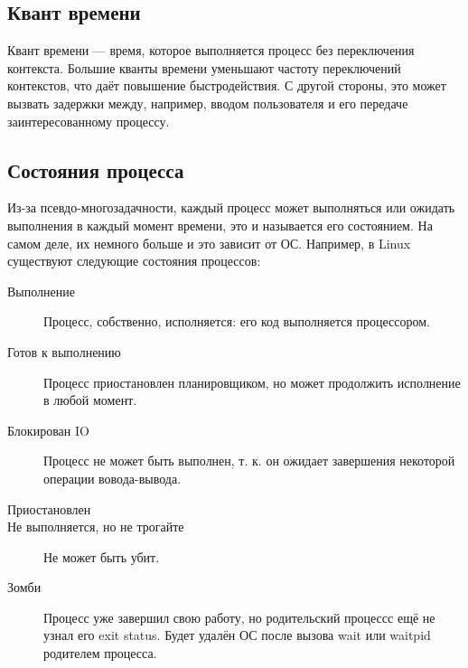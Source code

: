 \documentclass[main]{subfiles}
\begin{document}
\subsection{Квант времени}
Квант времени --- время, которое выполняется процесс без переключения контекста.
Большие кванты времени уменьшают частоту переключений контекстов, что даёт
повышение быстродействия. С другой стороны, это может вызвать задержки между,
например, вводом пользователя и его передаче заинтересованному процессу.

\subsection{Состояния процесса}
Из-за псевдо-многозадачности, каждый процесс может выполняться или ожидать
выполнения в каждый момент времени, это и называется его состоянием.
На самом деле, их немного больше и это зависит от ОС. Например, в Linux
существуют следующие состояния процессов:
\begin{description}
\item[Выполнение] Процесс, собственно, исполняется: его код выполняется
процессором.
\item[Готов к выполнению] Процесс приостановлен планировщиком, но может
продолжить исполнение в любой момент.
\item[Блокирован IO] Процесс не может быть выполнен, т. к. он ожидает
завершения некоторой операции вовода-вывода.
\item[Приостановлен]
\item[Не выполняется, но не трогайте] Не может быть убит.
\item[Зомби] Процесс уже завершил свою работу, но родительский процессс
ещё не узнал его exit status. Будет удалён ОС после вызова
wait или waitpid родителем процесса.
\end{description}
\end{document}
